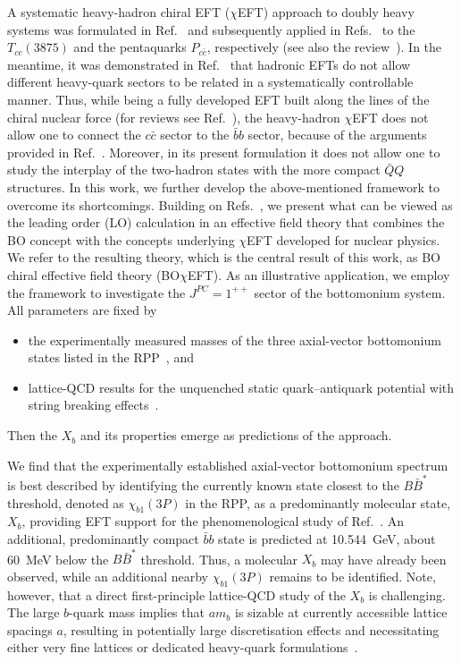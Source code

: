 \documentclass[aps,prd,showpacs,amsmath,twocolumn,superscriptaddress,floatfix,nofootinbib,notitlepage]{revtex4-2}
\newcommand{\Xb}{X_b}
\newcommand{\BOchiEFT}{BO$\chi$EFT\xspace}
\begin{document}
A systematic heavy-hadron chiral EFT ($\chi$EFT) approach to doubly heavy systems 
was formulated in Ref.~\cite{Baru:2011rs} and subsequently applied in Refs.~\cite{Du:2021zzh,Du:2019pij} to the $T_{cc}(3875)$ and the pentaquarks $P_{c\bar{c}}$, respectively (see also the review~\cite{Meng:2022ozq}). In the meantime, it was demonstrated in Ref.~\cite{Baru:2018qkb} that hadronic EFTs do not allow different heavy-quark sectors to be related in a systematically controllable manner. Thus, while being a fully developed EFT built along the lines of the chiral nuclear force (for reviews see Ref.~\cite{Epelbaum:2008ga,Epelbaum:2019kcf}), the heavy-hadron $\chi$EFT does not allow one to connect the $c\bar{c}$ sector to the $\bar{b}b$ sector, because of the arguments provided in Ref.~\cite{Baru:2018qkb}. Moreover, in its present formulation it does not allow one to study the interplay of the two-hadron states with the more compact $\bar{Q}Q$ structures.
In this work, we further develop the above-mentioned framework to overcome its shortcomings. Building on Refs.~\cite{Baru:2010ww,Hanhart:2011jz,Guo:2016bjq,Hammer:2016prh,Hanhart:2022qxq}, we present what can be viewed as the leading order (LO) calculation in an effective field theory that combines the BO concept with the concepts underlying $\chi$EFT developed for nuclear physics. We refer to the resulting theory, which is the central result of this work, as BO chiral effective field theory (\BOchiEFT).
As an illustrative application, we employ the framework to investigate the $J^{PC}=1^{++}$
sector of the bottomonium system.
All parameters are fixed by
\begin{itemize}
\item 
the experimentally measured masses of the three axial-vector bottomonium states listed in the RPP~\cite{ParticleDataGroup:2026mpi}, and 
\item lattice-QCD results for the unquenched static quark--antiquark potential with string breaking effects~\cite{Bulava:2024jpj}. 
\end{itemize}
Then the $\Xb$ and its properties emerge as predictions of the
approach.

We find that the experimentally established axial-vector bottomonium spectrum is best described by identifying the currently known state closest to the $B\bar{B}^*$ threshold, denoted as $\chi_{b1}(3P)$ in the RPP, as a predominantly molecular state, $\Xb$, providing EFT support for the phenomenological study of Ref.~\cite{Karliner:2014lta}. 
An additional, predominantly compact $\bar{b}b$ state is predicted at 10.544~GeV, about 60~MeV below the $B\bar{B}^*$ threshold. Thus, a molecular $\Xb$ may have already been observed, while an additional nearby $\chi_{b1}(3P)$ remains to be identified. Note, however, that a direct first-principle lattice-QCD study of the $\Xb$ is challenging. The large $b$-quark mass implies that $a m_b$ is sizable at currently accessible lattice spacings $a$, resulting in potentially large discretisation effects and necessitating either very fine lattices or dedicated heavy-quark formulations~\cite{Hashimoto:2004fv,Bicudo:2022cqi}. 
\end{document}

